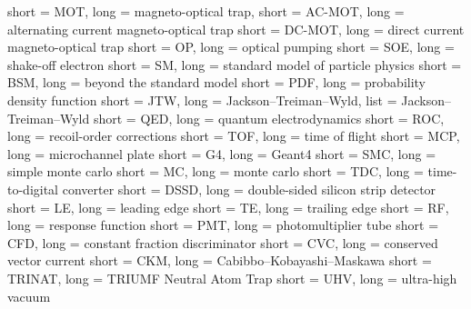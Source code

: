 % 
% 
% 

{
	short = MOT,
	long = magneto-optical trap,
}
{
	short = AC-MOT,
	long = alternating current magneto-optical trap
}
{
	short = DC-MOT,
	long = direct current magneto-optical trap
}
{
	short = OP,
	long = optical pumping
}
{
	short = SOE,
	long = shake-off electron
}
{
	short = SM,
	long = standard model of particle physics
}
{
	short = BSM,
	long = beyond the standard model
}
{
	short = PDF,
	long = probability density function
}
{
	short = JTW,
	long = Jackson--Treiman--Wyld,
	list = Jackson--Treiman--Wyld \cite{jtw}\cite{jtw_coulomb}
}
{
	short = QED,
	long = quantum electrodynamics
}
{
	short = ROC,
	long = recoil-order corrections
}
{
	short = TOF,
	long = time of flight
}
{
	short = MCP,
	long = microchannel plate
}
{
	short = G4,
	long = Geant4
}
{
	short = SMC,
	long = simple monte carlo
}
{
	short = MC,
	long = monte carlo
}
{
	short = TDC,
	long = time-to-digital converter
}
{
	short = DSSD,
	long = double-sided silicon strip detector
}
{
	short = LE,
	long = leading edge
}
{
	short = TE,
	long = trailing edge
}
{
	short = RF,
	long = response function
}
{
	short = PMT,
	long = photomultiplier tube
}
{
	short = CFD,
	long = constant fraction discriminator
}
{
	short = CVC,
	long = conserved vector current
}
{
	short = CKM,
	long = Cabibbo--Kobayashi--Maskawa
}
{
	short = TRINAT,
	long = TRIUMF Neutral Atom Trap
}
{
	short = UHV,
	long = ultra-high vacuum
}













